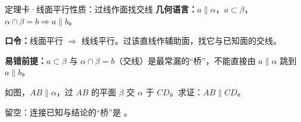 \documentclass{exam-zh}
\begin{document}
\begin{eduDualExplain}
  \begin{eduExplainLeft}
  \end{eduExplainLeft}

  \begin{eduExplainRight}
  \end{eduExplainRight}
\end{eduDualExplain}





\begin{eduSolutionBox}{定理卡·线面平行性质：过线作面找交线}
  \begingroup
  \setlength{\parskip}{2.5mm}
\textbf{几何语言：}$a\parallel\alpha$，$a\subset\beta$，$\alpha\cap\beta=b\Rightarrow a\parallel b$。\par
\textbf{口令：}线面平行 $\Rightarrow$ 线线平行。过该直线作辅助面，找它与已知面的交线。\par
\textbf{易错前提：}$a\subset\beta$ 与 $\alpha\cap\beta=b$（交线）是最常漏的“桥”，不能直接由 $a\parallel\alpha$ 跳到 $a\parallel b$。\par
  \endgroup
\end{eduSolutionBox}




\begin{eduProblemBlock}[例2·线面平行性质]
\noindent
\begin{minipage}[t]{\dimexpr\linewidth-70mm-6mm\relax}
\vspace{0pt}
如图，$AB\parallel\alpha$，过 $AB$ 的平面 $\beta$ 交 $\alpha$ 于 $CD$。求证：$AB\parallel CD$。
\par\noindent 留空：连接已知与结论的“桥”是 \underline{\hspace{20mm}}。

\end{minipage}\hfill
\begin{diagramcoltikz}{70mm}{AB 在面外平行于平面 α，过 AB 作平面 β 与 α 交于 CD。}
}
\end{diagramcoltikz}
\end{eduProblemBlock}
\end{document}
